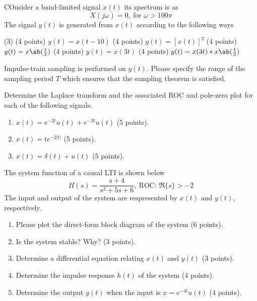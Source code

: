 \documentclass{article}
\begin{document}
\begin{problem}[20 pt]
  COnsider a band-limited signal $x(t)$ its spectrum is as
  \[X(j\omega) = 0,~ \text{for } \omega > 100\pi\]
  The signal $y(t)$ is generated from $x(t)$ according to the following ways
  \begin{tasks}[label = \roman*.](3)
    \task (4 points) $y(t) = x(t - 10)$
    \task (4 points) $y(t) = [x(t)]^2$
    \task (4 points) $y(t) = x\ab(\frac t2)$
    \task (4 points) $y(t) = x(3t)$
    \task (4 points) $y(t) = x(3t) * x\ab(\frac t2)$
  \end{tasks}
  Impulse-train sampling is performed on $y(t)$.
  Please specify the range of the sampling period $T$
  which ensures that the sampling theorem is satisfied.
\end{problem}
\begin{solution}

\end{solution}

\begin{problem}[15 pt]
  Determine the Laplace transform and the associated ROC and pole-zero plot
  for each of the following signals.
  \begin{enumerate}
    \item $x(t) = e^{-2t} u(t) + e^{-3t} u(t)$ (5 points).
    \item $x(t) = te^{-2|t|}$ (5 points).
    \item $x(t) = \delta(t) + u(t)$ (5 points).
  \end{enumerate}
\end{problem}
\begin{solution}

\end{solution}

\begin{problem}[20 pt]
  The system function of a causal LTI is shown below
  \[H(s) = \frac{s + 4}{s^2 + 5s + 6},~ \text{ROC: } \Re\{s\} > -2\]
  The input and output of the system
  are respresented by $x(t)$ and $y(t)$, respectively.
  \begin{enumerate}
    \item Please plot the direct-form block diagram of the system (6 points).
    \item Is the system stable? Why? (3 points).
    \item Determine a differential equation
      relating $x(t)$ and $y(t)$ (3 points).
    \item Determine the impulse response $h(t)$ of the system (4 points).
    \item Determine the output $y(t)$ when the input is $x = e^{-4t} u(t)$ (4 points).
  \end{enumerate}
\end{problem}
\begin{solution}

\end{solution}
\end{document}
